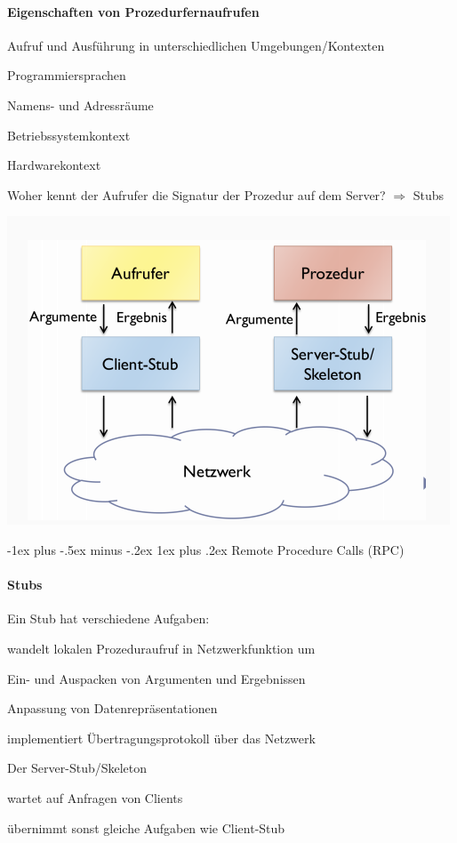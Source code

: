 \documentclass[10pt]{article}
\makeatletter
\renewcommand{\subsubsection}{\@startsection{subsubsection}{3}{0mm}%
                                {-1ex plus -.5ex minus -.2ex}%
                                {1ex plus .2ex}%
                                {\normalfont\small\bfseries}}
\makeatother
\begin{document}
\paragraph{Eigenschaften von Prozedurfernaufrufen}

Aufruf und Ausführung in unterschiedlichen Umgebungen/Kontexten
\begin{itemize*}
  \item Programmiersprachen
  \item Namens- und Adressräume
  \item Betriebssystemkontext
  \item Hardwarekontext
\end{itemize*}
Woher kennt der Aufrufer die Signatur der Prozedur auf dem Server? $\Rightarrow$ \color{orange} Stubs \color{black}
\begin{center}
  \includegraphics[width=0.4\linewidth]{Assets/Programmierparadigmen-netzwerk-stubs}
\end{center}

\subsubsection{Remote Procedure Calls (RPC)}
\paragraph{Stubs}

Ein Stub hat verschiedene Aufgaben: 
\begin{itemize*}
  \item wandelt lokalen Prozeduraufruf in Netzwerkfunktion um
  \item Ein- und Auspacken von Argumenten und Ergebnissen
  \item Anpassung von Datenrepräsentationen
  \item implementiert Übertragungsprotokoll über das Netzwerk
\end{itemize*}
Der Server-Stub/Skeleton
\begin{itemize*}
  \item wartet auf Anfragen  von Clients
  \item übernimmt sonst gleiche Aufgaben wie Client-Stub
\end{itemize*}
\end{document}
